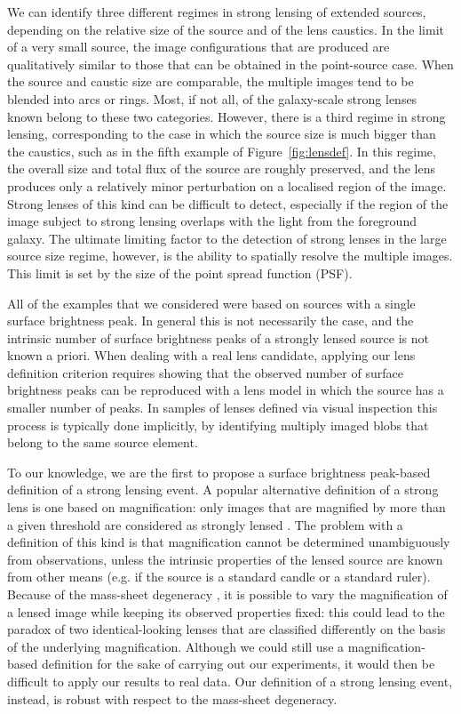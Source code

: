 \documentclass{aa}
\def\Fref#1{Figure~\ref{#1}\xspace}
\begin{document}
We can identify three different regimes in strong lensing of extended sources, depending on the relative size of the source and of the lens caustics.
In the limit of a very small source, the image configurations that are produced are qualitatively similar to those that can be obtained in the point-source case.
When the source and caustic size are comparable, the multiple images tend to be blended into arcs or rings. 
Most, if not all, of the galaxy-scale strong lenses known belong to these two categories.
However, there is a third regime in strong lensing, corresponding to the case in which the source size is much bigger than the caustics, such as in the fifth example of \Fref{fig:lensdef}.
In this regime, the overall size and total flux of the source are roughly preserved, and the lens produces only a relatively minor perturbation on a localised region of the image.
Strong lenses of this kind can be difficult to detect, especially if the region of the image subject to strong lensing overlaps with the light from the foreground galaxy. 
The ultimate limiting factor to the detection of strong lenses in the large source size regime, however, is the ability to spatially resolve the multiple images. This limit is set by the size of the point spread function (PSF).

All of the examples that we considered were based on sources with a single surface brightness peak.
In general this is not necessarily the case, and the intrinsic number of surface brightness peaks of a strongly lensed source is not known a priori.
When dealing with a real lens candidate, applying our lens definition criterion requires showing that the observed number of surface brightness peaks can be reproduced with a lens model in which the source has a smaller number of peaks.
In samples of lenses defined via visual inspection this process is typically done implicitly, by identifying multiply imaged blobs that belong to the same source element.

To our knowledge, we are the first to propose a surface brightness peak-based definition of a strong lensing event.
A popular alternative definition of a strong lens is one based on magnification: only images that are magnified by more than a given threshold are considered as strongly lensed \citep[see e.g.][]{Hil++07}.
The problem with a definition of this kind is that magnification cannot be determined unambiguously from observations, unless the intrinsic properties of the lensed source are known from other means (e.g. if the source is a standard candle or a standard ruler).
Because of the mass-sheet degeneracy \citep{FGS85}, it is possible to vary the magnification of a lensed image while keeping its observed properties fixed: this could lead to the paradox of two identical-looking lenses that are classified differently on the basis of the underlying magnification.
Although we could still use a magnification-based definition for the sake of carrying out our experiments, it would then be difficult to apply our results to real data.
Our definition of a strong lensing event, instead, is robust with respect to the mass-sheet degeneracy.
\end{document}

